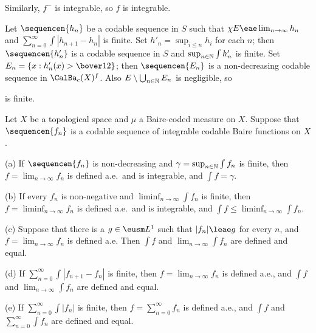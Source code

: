 {Similarly, $f^-$ is integrable, so $f$ is integrable.

\medskip

 Let $\sequencen{h_n}$ be a codable sequence in $S$ such
that $\chi E\eae\lim_{n\to\infty}h_n$ and
$\sum_{n=0}^{\infty}\int|h_{n+1}-h_n|$ is finite.   Set
$h'_n=\sup_{i\le n}h_i$ for each $n$;  then $\sequencen{h'_n}$ is a codable
sequence in $S$ and
$\sup_{n\in\Bbb N}\int h'_n$ is finite.   Set
$E_n=\{x:h'_n(x)>\bover12\}$;  then $\sequencen{E_n}$ is a non-decreasing
codable sequence in $\CalBa_c(X)^f$.   Also
$E\setminus\bigcup_{n\in\Bbb N}E_n$ is negligible, so


\noindent is finite.
}%

 Let $X$ be a topological space and
$\mu$ a Baire-coded measure on $X$.   Suppose that $\sequencen{f_n}$ is a
codable sequence of integrable codable Baire functions on $X$.

(a) If $\sequencen{f_n}$ is non-decreasing and
$\gamma=\sup_{n\in\Bbb N}\int f_n$ is finite, then
$f=\lim_{n\to\infty}f_n$ is defined a.e.\ and is integrable, and
$\int f=\gamma$.

(b) If every $f_n$ is non-negative and $\liminf_{n\to\infty}\int f_n$
is finite, then $f=\liminf_{n\to\infty}f_n$ is defined a.e.\ and is
integrable, and $\int f\le\liminf_{n\to\infty}\int f_n$.

(c) Suppose that
there is a $g\in\eusm L^1$ such that $|f_n|\leae g$ for every $n$,
and $f=\lim_{n\to\infty}f_n$ is defined a.e.   Then $\int f$ and
$\lim_{n\to\infty}\int f_n$ are defined and equal.

(d) If $\sum_{n=0}^{\infty}\int|f_{n+1}-f_n|$
is finite, then $f=\lim_{n\to\infty}f_n$ is defined a.e., and $\int f$ and
$\lim_{n\to\infty}\int f_n$ are defined and equal.

(e) If $\sum_{n=0}^{\infty}\int|f_n|$ is
finite, then $f=\sum_{n=0}^{\infty}f_n$ is defined a.e., and $\int f$ and
$\sum_{n=0}^{\infty}\int f_n$ are defined and equal.

